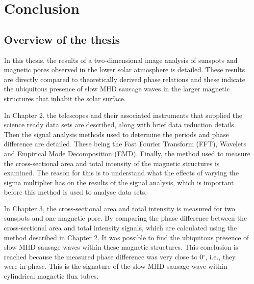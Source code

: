 \graphicspath{{Chapter6/Figs/}}

\chapter{Conclusion}
\label{chapter6}
    
    \vspace*{\fill}\par
    \pagebreak

\section{Overview of the thesis}
    
	In this thesis, the results of a two-dimensional image analysis of sunspots and magnetic pores observed in the lower solar atmosphere is detailed.
    These results are directly compared to theoretically derived phase relations and these indicate the ubiquitous presence of slow MHD sausage waves in the larger magnetic structures that inhabit the solar surface.
    
    In Chapter 2, the telescopes and their associated instruments that supplied the science ready data sets are described, along with brief data reduction details.
    Then the signal analysis methods used to determine the periods and phase difference are detailed.
    These being the Fast Fourier Transform (FFT), Wavelets and Empirical Mode Decomposition (EMD).
    Finally, the method used to measure the cross-sectional area and total intensity of the magnetic structures is examined.
    The reason for this is to understand what the effects of varying the sigma multiplier has on the results of the signal analysis, which is important before this method is used to analyse data sets.
    
    In Chapter 3, the cross-sectional area and total intensity is measured for two sunspots and one magnetic pore.
    By comparing the phase difference between the cross-sectional area and total intensity signals, which are calculated using the method described in Chapter 2.
    It was possible to find the ubiquitous presence of slow MHD sausage waves within these magnetic structures.
    This conclusion is reached because the measured phase difference was very close to 0$^\circ$, i.e., they were in phase.
    This is the signature of the slow MHD sausage wave within cylindrical magnetic flux tubes.
    
